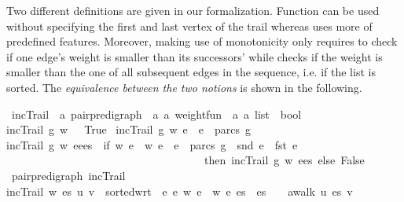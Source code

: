 \begin{isabellebody}
\begin{isamarkuptext}
Two different definitions
are given in our formalization. Function  can be used without specifying the first and last vertex of the trail
whereas  uses more of  predefined features. Moreover, making use of  monotonicity
\mbox{} only requires to check if one edge's weight is smaller than its successors' while 
checks if the weight is smaller than the one of all subsequent edges in the sequence, i.e. if the list 
is sorted. The {\em equivalence
between the two notions} is shown in the following.%
\end{isamarkuptext}\isamarkuptrue%
\isamarkupfalse%
\ incTrail\ {\isacharcolon}{\isacharcolon}\ {\isachardoublequoteopen}{\isacharprime}a\ pair{\isacharunderscore}pre{\isacharunderscore}digraph\ {\isasymRightarrow}\ {\isacharparenleft}{\isacharprime}a\ {\isasymtimes}{\isacharprime}a{\isacharparenright}\ weight{\isacharunderscore}fun\ {\isasymRightarrow}\ {\isacharparenleft}{\isacharprime}a\ {\isasymtimes}{\isacharprime}a{\isacharparenright}\ list\ {\isasymRightarrow}\ bool{\isachardoublequoteclose}\ \isanewline
{\isachardoublequoteopen}incTrail\ g\ w\ {\isacharbrackleft}{\isacharbrackright}\ {\isacharequal}\ True{\isachardoublequoteclose}\ {\isacharbar}\isanewline
{\isachardoublequoteopen}incTrail\ g\ w\ {\isacharbrackleft}e\ {\isacharequal}\ {\isacharparenleft}e\ {\isasymin}\ parcs\ g{\isacharparenright}{\isachardoublequoteclose}\ {\isacharbar}\isanewline
{\isachardoublequoteopen}incTrail\ g\ w\ {\isacharparenleft}eees{\isacharparenright}\ {\isacharequal}\ {\isacharparenleft}if\ w\ e\ {\isacharless}\ w\ e\ {\isasymand}\ e\ {\isasymin}\ parcs\ g\ {\isasymand}\ snd\ e\ {\isacharequal}\ fst\ e\ \isanewline
\ \ \ \ \ \ \ \ \ \ \ \ \ \ \ \ \ \ \ \ \ \ \ \ \ \ \ \ \ \ \ \ \ \ \ \ then\ incTrail\ g\ w\ {\isacharparenleft}ees{\isacharparenright}\ else\ False{\isacharparenright}{\isachardoublequoteclose}\isanewline
\isanewline
{}\isamarkupfalse%
{\isacharparenleft}\ pair{\isacharunderscore}pre{\isacharunderscore}digraph{\isacharparenright}\ incTrail{}\ \isanewline
{\isachardoublequoteopen}incTrail{}\ w\ es\ u\ v\ {\isasymequiv}\ sorted{\isacharunderscore}wrt\ {\isacharparenleft}{\isasymlambda}\ e\ e\ w\ e\ {\isacharless}\ w\ e\ es\ {\isasymand}\ {\isacharparenleft}es\ {\isacharequal}\ {\isacharbrackleft}{\isacharbrackright}\ {\isasymor}\ awalk\ u\ es\ v{\isacharparenright}{\isachardoublequoteclose}\isanewline

\end{isabellebody}
